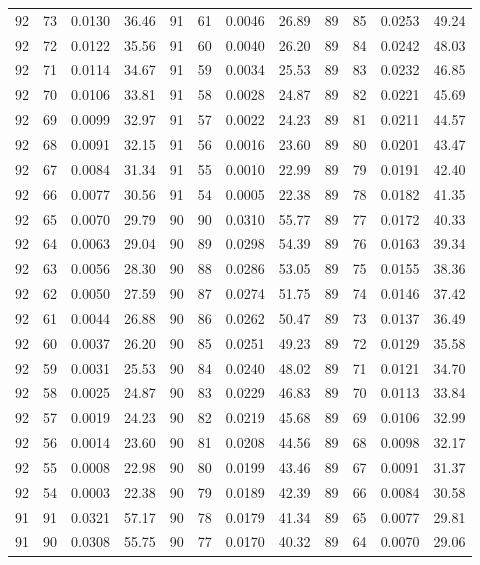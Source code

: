 \begin{tabular}{llll|llll|llll}
92 & 73 & 0.0130 & 36.46 & 91 & 61 & 0.0046 & 26.89 & 89 & 85 & 0.0253 & 49.24\\
92 & 72 & 0.0122 & 35.56 & 91 & 60 & 0.0040 & 26.20 & 89 & 84 & 0.0242 & 48.03\\
92 & 71 & 0.0114 & 34.67 & 91 & 59 & 0.0034 & 25.53 & 89 & 83 & 0.0232 & 46.85\\
92 & 70 & 0.0106 & 33.81 & 91 & 58 & 0.0028 & 24.87 & 89 & 82 & 0.0221 & 45.69\\
92 & 69 & 0.0099 & 32.97 & 91 & 57 & 0.0022 & 24.23 & 89 & 81 & 0.0211 & 44.57\\
92 & 68 & 0.0091 & 32.15 & 91 & 56 & 0.0016 & 23.60 & 89 & 80 & 0.0201 & 43.47\\
92 & 67 & 0.0084 & 31.34 & 91 & 55 & 0.0010 & 22.99 & 89 & 79 & 0.0191 & 42.40\\
92 & 66 & 0.0077 & 30.56 & 91 & 54 & 0.0005 & 22.38 & 89 & 78 & 0.0182 & 41.35\\
92 & 65 & 0.0070 & 29.79 & 90 & 90 & 0.0310 & 55.77 & 89 & 77 & 0.0172 & 40.33\\
92 & 64 & 0.0063 & 29.04 & 90 & 89 & 0.0298 & 54.39 & 89 & 76 & 0.0163 & 39.34\\
92 & 63 & 0.0056 & 28.30 & 90 & 88 & 0.0286 & 53.05 & 89 & 75 & 0.0155 & 38.36\\
92 & 62 & 0.0050 & 27.59 & 90 & 87 & 0.0274 & 51.75 & 89 & 74 & 0.0146 & 37.42\\
92 & 61 & 0.0044 & 26.88 & 90 & 86 & 0.0262 & 50.47 & 89 & 73 & 0.0137 & 36.49\\
92 & 60 & 0.0037 & 26.20 & 90 & 85 & 0.0251 & 49.23 & 89 & 72 & 0.0129 & 35.58\\
92 & 59 & 0.0031 & 25.53 & 90 & 84 & 0.0240 & 48.02 & 89 & 71 & 0.0121 & 34.70\\
92 & 58 & 0.0025 & 24.87 & 90 & 83 & 0.0229 & 46.83 & 89 & 70 & 0.0113 & 33.84\\
92 & 57 & 0.0019 & 24.23 & 90 & 82 & 0.0219 & 45.68 & 89 & 69 & 0.0106 & 32.99\\
92 & 56 & 0.0014 & 23.60 & 90 & 81 & 0.0208 & 44.56 & 89 & 68 & 0.0098 & 32.17\\
92 & 55 & 0.0008 & 22.98 & 90 & 80 & 0.0199 & 43.46 & 89 & 67 & 0.0091 & 31.37\\
92 & 54 & 0.0003 & 22.38 & 90 & 79 & 0.0189 & 42.39 & 89 & 66 & 0.0084 & 30.58\\
91 & 91 & 0.0321 & 57.17 & 90 & 78 & 0.0179 & 41.34 & 89 & 65 & 0.0077 & 29.81\\
91 & 90 & 0.0308 & 55.75 & 90 & 77 & 0.0170 & 40.32 & 89 & 64 & 0.0070 & 29.06\\

\end{tabular}

